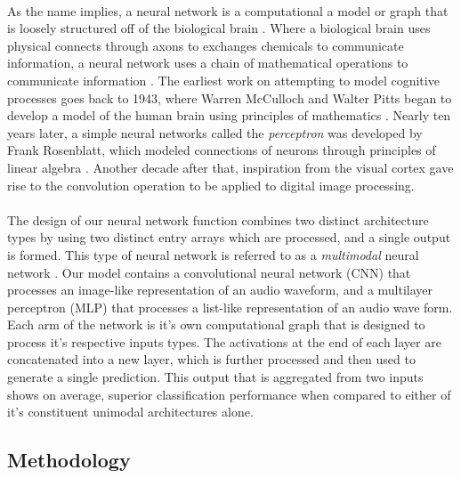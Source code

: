 \documentclass[12pt,letterpaper]{article}
\begin{document}
\paragraph*{}As the name implies, a neural network is a computational a model or graph that is loosely structured off of the biological brain \cite{Geron,Loy}. Where a biological brain uses physical connects through axons to exchanges chemicals to communicate information, a neural network uses a chain of mathematical operations to communicate information \cite{Goodfellow}. The earliest work on attempting to model cognitive processes goes back to 1943, where Warren McCulloch and Walter Pitts began to develop a model of the human brain using principles of mathematics \cite{McCulloch,Loy}. Nearly ten years later, a simple neural networks called the \textit{perceptron} was developed by Frank Rosenblatt, which modeled connections of neurons through principles of linear algebra \cite{Geron,Petrik}. Another decade after that, inspiration from the visual cortex gave rise to the convolution operation to be applied to digital image processing. 

\paragraph*{}The design of our neural network function combines two distinct architecture types by using two distinct entry arrays which are processed, and a single output is formed. This type of neural network is referred to as a \textit{multimodal} neural network \cite{Li,Ngiam}. Our model contains a convolutional neural network (CNN) that processes an image-like representation of an audio waveform, and a multilayer perceptron (MLP) that processes a list-like representation of an audio wave form. Each arm of the network is it's own computational graph that is designed to process it's respective inputs types. The activations at the end of each layer are concatenated into a new layer, which is further processed and then used to generate a single prediction. This output that is aggregated from two inputs shows on average, superior classification performance when compared to either of it's constituent unimodal architectures alone.


\newpage
\subsection{Methodology}
\label{sec-Methodology}
\end{document}
